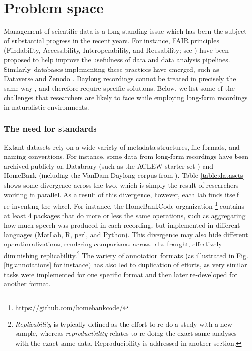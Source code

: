 \documentclass[smallextended]{svjour3}       %
\begin{document}
\section{Problem space}\label{section:problemspace}

Management of scientific data is a long-standing issue which has been the subject of substantial progress in the recent years. For instance, FAIR principles (Findability, Accessibility, Interoperability, and Reusability; see \citealt{Wilkinson2016}) have been proposed to help improve the usefulness of data and data analysis pipelines. Similarly, databases implementing these practices have emerged, such as Dataverse \citep{dataverse} and Zenodo \citep{zenodo}. Daylong recordings cannot be treated in precisely the same way \citep{Cychosz2020}, and therefore require specific solutions. Below, we list some of the challenges that researchers are likely to face while employing long-form recordings in naturalistic environments.

\subsubsection*{The need for standards}

Extant datasets rely on a wide variety of metadata structures, file formats, and naming conventions. For instance, some data from long-form recordings have been archived publicly on Databrary (such as the ACLEW starter set \citep{starter}) and HomeBank (including the VanDam Daylong corpus from \citealt{vandam-day}). Table \ref{table:datasets} shows some divergence across the two, which is simply the result of researchers working in parallel. As a result of this divergence, however, each lab finds itself re-inventing the wheel. For instance, the HomeBankCode organization \footnote{\url{https://github.com/homebankcode/}} contains at least 4 packages that do more or less the same operations, such as aggregating how much speech was produced in each recording, but implemented in different languages (MatLab,  R, perl, and Python). This divergence may also hide different operationalizations, rendering comparisons across labs fraught, effectively diminishing replicability.\footnote{\textit{Replicability} is typically defined as the effort to re-do a study with a new sample, whereas \textit{reproducibility} relates to re-doing the exact same analyses with the exact same data. Reproducibility is addressed in another section.} The variety of annotation formats (as illustrated in Fig. \ref{fig:annotations} for instance) has also led to duplication of efforts, as very similar tasks were implemented for one specific format and then later re-developed for another format.
\end{document}
